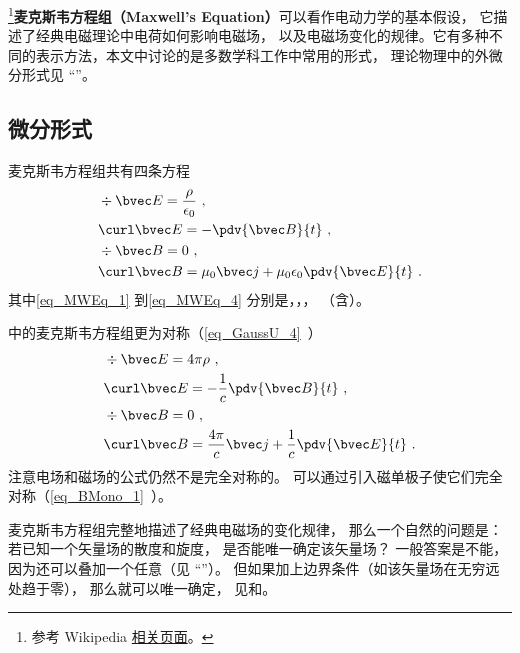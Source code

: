
\begin{issues}
\end{issues}


\footnote{参考 Wikipedia \href{https://en.wikipedia.org/wiki/Maxwell's_equations}{相关页面}。}\textbf{麦克斯韦方程组（Maxwell's Equation）}可以看作电动力学的基本假设， 它描述了经典电磁理论中电荷如何影响电磁场， 以及电磁场变化的规律。它有多种不同的表示方法，本文中讨论的是多数学科工作中常用的形式， 理论物理中的外微分形式见 “”。

\subsection{微分形式}
麦克斯韦方程组共有四条方程
\begin{align}\label{eq_MWEq_1}
&\div \bvec E = \frac{\rho}{\epsilon_0}~,\\
\label{eq_MWEq_2}
&\curl \bvec E = -\pdv{\bvec B}{t}~,\\
\label{eq_MWEq_3}
&\div \bvec B = 0~,\\
\label{eq_MWEq_4}
&\curl \bvec B = \mu_0 \bvec j + \mu_0\epsilon_0 \pdv{\bvec E}{t}~.
\end{align}
其中\autoref{eq_MWEq_1} 到\autoref{eq_MWEq_4} 分别是，，， （含）。

中的麦克斯韦方程组更为对称（\autoref{eq_GaussU_4}~）
\begin{equation}
\begin{aligned}
&\div \bvec E = 4\pi\rho~,\\
&\curl \bvec E = -\frac{1}{c}\pdv{\bvec B}{t}~,\\
&\div \bvec B = 0 ~,\\
&\curl \bvec B = \frac{4\pi}{c} \bvec j + \frac{1}{c}\pdv{\bvec E}{t}~.
\end{aligned}
\end{equation}
注意电场和磁场的公式仍然不是完全对称的。 可以通过引入磁单极子使它们完全对称（\autoref{eq_BMono_1}~）。

麦克斯韦方程组完整地描述了经典电磁场的变化规律， 那么一个自然的问题是： 若已知一个矢量场的散度和旋度， 是否能唯一确定该矢量场？ 一般答案是不能， 因为还可以叠加一个任意（见 “”）。 但如果加上边界条件（如该矢量场在无穷远处趋于零）， 那么就可以唯一确定， 见和。

